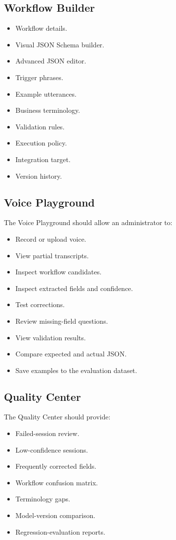 \documentclass[11pt,a4paper]{article}
\begin{document}
\subsection{Workflow Builder}

\begin{itemize}
\item Workflow details.
\item Visual JSON Schema builder.
\item Advanced JSON editor.
\item Trigger phrases.
\item Example utterances.
\item Business terminology.
\item Validation rules.
\item Execution policy.
\item Integration target.
\item Version history.
\end{itemize}

\subsection{Voice Playground}

The Voice Playground should allow an administrator to:

\begin{itemize}
\item Record or upload voice.
\item View partial transcripts.
\item Inspect workflow candidates.
\item Inspect extracted fields and confidence.
\item Test corrections.
\item Review missing-field questions.
\item View validation results.
\item Compare expected and actual JSON.
\item Save examples to the evaluation dataset.
\end{itemize}

\subsection{Quality Center}

The Quality Center should provide:

\begin{itemize}
\item Failed-session review.
\item Low-confidence sessions.
\item Frequently corrected fields.
\item Workflow confusion matrix.
\item Terminology gaps.
\item Model-version comparison.
\item Regression-evaluation reports.
\end{itemize}
\end{document}
